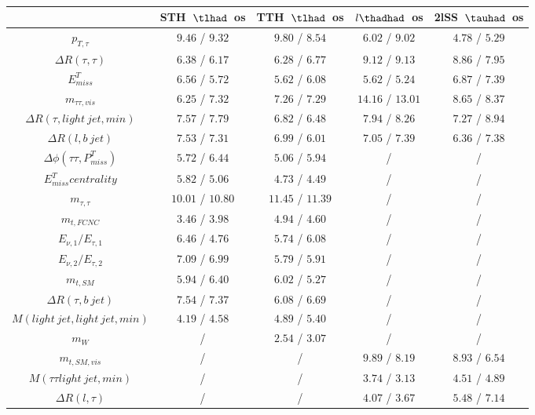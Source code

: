 \begin{table}
\footnotesize
\caption{}
\centering
\begin{tabular}{|c|c|c|c|c|} \hline
 & STH~$\tlhad$~os & TTH~$\tlhad$~os & $l\thadhad$~os & 2lSS~$\tauhad$~os\\\hline
$p_{T,\tau }$ & $9.46$ / $9.32$ & $9.80$ / $8.54$ & $6.02$ / $9.02$ & $4.78$ / $5.29$\\\hline
$\Delta R(\tau ,\tau )$ & $6.38$ / $6.17$ & $6.28$ / $6.77$ & $9.12$ / $9.13$ & $8.86$ / $7.95$\\\hline
$E^{T}_{miss}$ & $6.56$ / $5.72$ & $5.62$ / $6.08$ & $5.62$ / $5.24$ & $6.87$ / $7.39$\\\hline
$m_{\tau \tau ,vis}$ & $6.25$ / $7.32$ & $7.26$ / $7.29$ & $14.16$ / $13.01$ & $8.65$ / $8.37$\\\hline
$\Delta R(\tau ,light~jet,min)$ & $7.57$ / $7.79$ & $6.82$ / $6.48$ & $7.94$ / $8.26$ & $7.27$ / $8.94$\\\hline
$\Delta R(l,b~jet)$ & $7.53$ / $7.31$ & $6.99$ / $6.01$ & $7.05$ / $7.39$ & $6.36$ / $7.38$\\\hline
$\Delta\phi(\tau \tau ,P^{T}_{miss})$ & $5.72$ / $6.44$ & $5.06$ / $5.94$ &  / &  /\\\hline
$E^{T}_{miss} centrality$ & $5.82$ / $5.06$ & $4.73$ / $4.49$ &  / &  /\\\hline
$m_{\tau ,\tau }$ & $10.01$ / $10.80$ & $11.45$ / $11.39$ &  / &  /\\\hline
$m_{t,FCNC}$ & $3.46$ / $3.98$ & $4.94$ / $4.60$ &  / &  /\\\hline
$E_{\nu,1}/E_{\tau ,1}$ & $6.46$ / $4.76$ & $5.74$ / $6.08$ &  / &  /\\\hline
$E_{\nu,2}/E_{\tau ,2}$ & $7.09$ / $6.99$ & $5.79$ / $5.91$ &  / &  /\\\hline
$m_{t,SM}$ & $5.94$ / $6.40$ & $6.02$ / $5.27$ &  / &  /\\\hline
$\Delta R(\tau ,b~jet)$ & $7.54$ / $7.37$ & $6.08$ / $6.69$ &  / &  /\\\hline
$M(light~jet,light~jet,min)$ & $4.19$ / $4.58$ & $4.89$ / $5.40$ &  / &  /\\\hline
$m_{W}$ &  / & $2.54$ / $3.07$ &  / &  /\\\hline
$m_{t,SM,vis}$ &  / &  / & $9.89$ / $8.19$ & $8.93$ / $6.54$\\\hline
$M(\tau \tau light~jet,min)$ &  / &  / & $3.74$ / $3.13$ & $4.51$ / $4.89$\\\hline
$\Delta R(l,\tau )$ &  / &  / & $4.07$ / $3.67$ & $5.48$ / $7.14$\\\hline

\end{tabular}
\end{table}
